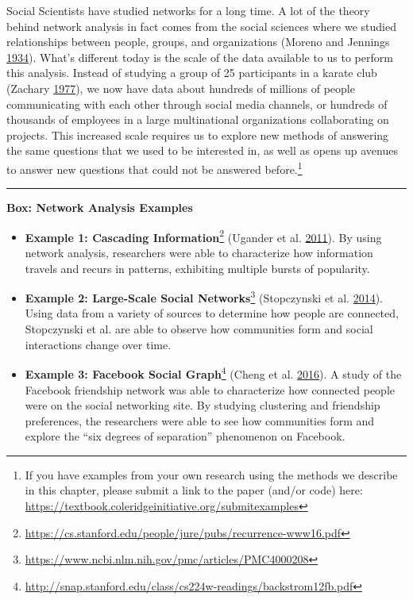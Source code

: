 \documentclass[]{krantz}
\begin{document}
Social Scientists have studied networks for a long time. A lot of the
theory behind network analysis in fact comes from the social sciences
where we studied relationships between people, groups, and organizations
(Moreno and Jennings \protect\hyperlink{ref-moreno1934}{1934}). What's
different today is the scale of the data available to us to perform this
analysis. Instead of studying a group of 25 participants in a karate
club (Zachary \protect\hyperlink{ref-zachary1977}{1977}), we now have
data about hundreds of millions of people communicating with each other
through social media channels, or hundreds of thousands of employees in
a large multinational organizations collaborating on projects. This
increased scale requires us to explore new methods of answering the same
questions that we used to be interested in, as well as opens up avenues
to answer new questions that could not be answered before.\footnote{If
  you have examples from your own research using the methods we describe
  in this chapter, please submit a link to the paper (and/or code) here:
  \url{https://textbook.coleridgeinitiative.org/submitexamples}}

\begin{center}\rule{0.5\linewidth}{\linethickness}\end{center}

\textbf{Box: Network Analysis Examples}

\begin{itemize}
\item
  \textbf{Example 1: Cascading Information}\footnote{\url{https://cs.stanford.edu/people/jure/pubs/recurrence-www16.pdf}}
  (Ugander et al. \protect\hyperlink{ref-ugander2011}{2011}). By using
  network analysis, researchers were able to characterize how
  information travels and recurs in patterns, exhibiting multiple bursts
  of popularity.
\item
  \textbf{Example 2: Large-Scale Social Networks}\footnote{\url{https://www.ncbi.nlm.nih.gov/pmc/articles/PMC4000208}}
  (Stopczynski et al. \protect\hyperlink{ref-stopczynski2014}{2014}).
  Using data from a variety of sources to determine how people are
  connected, Stopczynski et al. are able to observe how communities form
  and social interactions change over time.
\item
  \textbf{Example 3: Facebook Social Graph}\footnote{\url{http://snap.stanford.edu/class/cs224w-readings/backstrom12fb.pdf}}
  (Cheng et al. \protect\hyperlink{ref-cheng2016}{2016}). A study of the
  Facebook friendship network was able to characterize how connected
  people were on the social networking site. By studying clustering and
  friendship preferences, the researchers were able to see how
  communities form and explore the ``six degrees of separation''
  phenomenon on Facebook.
\end{itemize}
\end{document}
